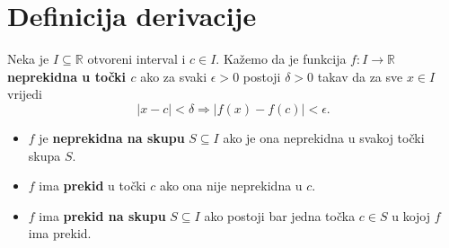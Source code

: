 \section{Definicija derivacije}
\begin{definition}
Neka je $I\subseteq \mathbb{R}$ otvoreni interval i $c\in I$. Kažemo da je funkcija $f : I\to \mathbb{R}$ \textbf{neprekidna u točki $c$} ako za svaki $\epsilon>0$ postoji $\delta>0$ takav da za sve $x\in I$ vrijedi 
$$|x-c|<\delta\Rightarrow |f(x)-f(c)|<\epsilon.$$
\begin{itemize}
\item $f$ je \textbf{neprekidna na skupu} $S\subseteq I$ ako je ona neprekidna u svakoj točki skupa $S$.
\item $f$ ima \textbf{prekid} u točki $c$ ako ona nije neprekidna u $c$.
\item $f$ ima \textbf{prekid na skupu} $S\subseteq I$ ako postoji bar jedna točka $c\in S$ u kojoj $f$ ima prekid.
\end{itemize}
\end{definition}

